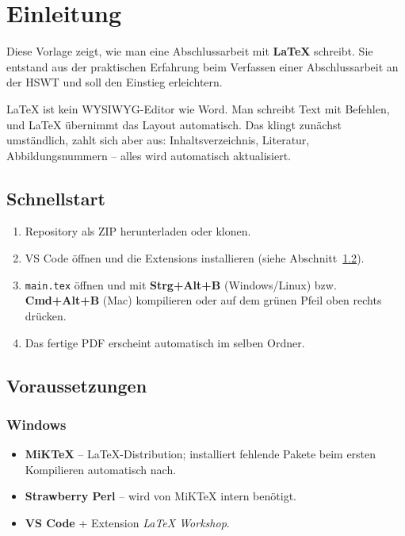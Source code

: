
\chapter{Einleitung}

Diese Vorlage zeigt, wie man eine Abschlussarbeit mit \textbf{LaTeX} schreibt.
Sie entstand aus der praktischen Erfahrung beim Verfassen einer Abschlussarbeit an der HSWT und soll den Einstieg erleichtern.

LaTeX ist kein WYSIWYG-Editor wie Word.
Man schreibt Text mit Befehlen, und LaTeX übernimmt das Layout automatisch.
Das klingt zunächst umständlich, zahlt sich aber aus: Inhaltsverzeichnis, Literatur, Abbildungsnummern – alles wird automatisch aktualisiert.

\section{Schnellstart}

\begin{enumerate}
    \item Repository als ZIP herunterladen oder klonen.
    \item VS Code öffnen und die Extensions installieren (siehe Abschnitt~\ref{sec:voraussetzungen}).
    \item \texttt{main.tex} öffnen und mit \textbf{Strg+Alt+B} (Windows/Linux) bzw. \textbf{Cmd+Alt+B} (Mac) kompilieren oder auf dem grünen Pfeil oben rechts drücken.
    \item Das fertige PDF erscheint automatisch im selben Ordner.
\end{enumerate}

\section{Voraussetzungen}
\label{sec:voraussetzungen}

\subsection{Windows}
\begin{itemize}
    \item \textbf{MiKTeX} – LaTeX-Distribution; installiert fehlende Pakete beim ersten Kompilieren automatisch nach.
    \item \textbf{Strawberry Perl} – wird von MiKTeX intern benötigt.
    \item \textbf{VS Code} + Extension \textit{LaTeX Workshop}.
\end{itemize}

